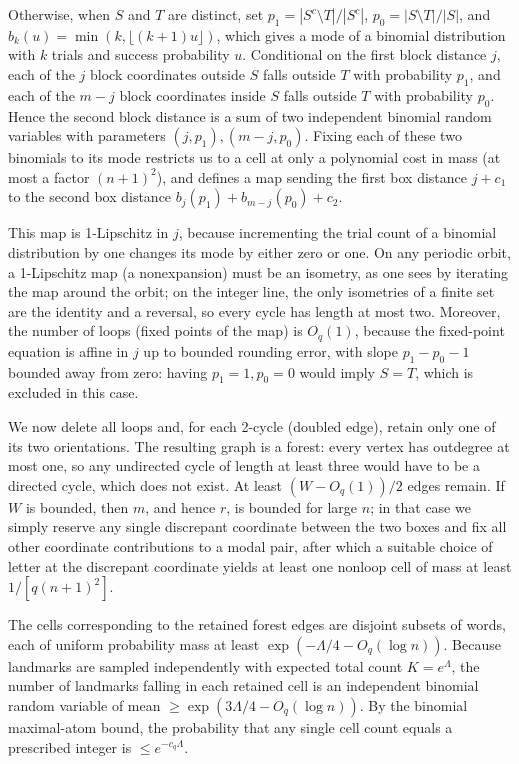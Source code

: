 Otherwise, when $S$ and $T$ are distinct, set $p_1=|S^c\setminus T|/|S^c|$, $p_0=|S\setminus T|/|S|$, and $b_k(u)=\min(k,\lfloor(k+1)u\rfloor)$, which gives a mode of a binomial distribution with $k$ trials and success probability $u$. Conditional on the first block distance $j$, each of the $j$ block coordinates outside $S$ falls outside $T$ with probability $p_1$, and each of the $m-j$ block coordinates inside $S$ falls outside $T$ with probability $p_0$. Hence the second block distance is a sum of two independent binomial random variables with parameters $(j,p_1),(m-j,p_0)$. Fixing each of these two binomials to its mode restricts us to a cell at only a polynomial cost in mass (at most a factor $(n+1)^2$), and defines a map sending the first box distance $j+c_1$ to the second box distance $b_j(p_1)+b_{m-j}(p_0)+c_2$.

This map is 1-Lipschitz in $j$, because incrementing the trial count of a binomial distribution by one changes its mode by either zero or one. On any periodic orbit, a 1-Lipschitz map (a nonexpansion) must be an isometry, as one sees by iterating the map around the orbit; on the integer line, the only isometries of a finite set are the identity and a reversal, so every cycle has length at most two. Moreover, the number of loops (fixed points of the map) is $O_q(1)$, because the fixed-point equation is affine in $j$ up to bounded rounding error, with slope $p_1-p_0-1$ bounded away from zero: having $p_1=1,p_0=0$ would imply $S=T$, which is excluded in this case.

We now delete all loops and, for each 2-cycle (doubled edge), retain only one of its two orientations. The resulting graph is a forest: every vertex has outdegree at most one, so any undirected cycle of length at least three would have to be a directed cycle, which does not exist. At least $(W-O_q(1))/2$ edges remain. If $W$ is bounded, then $m$, and hence $r$, is bounded for large $n$; in that case we simply reserve any single discrepant coordinate between the two boxes and fix all other coordinate contributions to a modal pair, after which a suitable choice of letter at the discrepant coordinate yields at least one nonloop cell of mass at least $1/[q(n+1)^2]$.

The cells corresponding to the retained forest edges are disjoint subsets of words, each of uniform probability mass at least $\exp(-\Lambda/4-O_q(\log n))$. Because landmarks are sampled independently with expected total count $K=e^{\Lambda}$, the number of landmarks falling in each retained cell is an independent binomial random variable of mean $\ge\exp(3\Lambda/4-O_q(\log n))$. By the binomial maximal-atom bound, the probability that any single cell count equals a prescribed integer is $\le e^{-c_q \Lambda}$.

